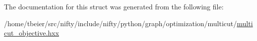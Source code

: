 The documentation for this struct was generated from the following file\+:\begin{DoxyCompactItemize}
\item 
/home/tbeier/src/nifty/include/nifty/python/graph/optimization/multicut/\hyperlink{python_2graph_2optimization_2multicut_2multicut__objective_8hxx}{multicut\+\_\+objective.\+hxx}\end{DoxyCompactItemize}
